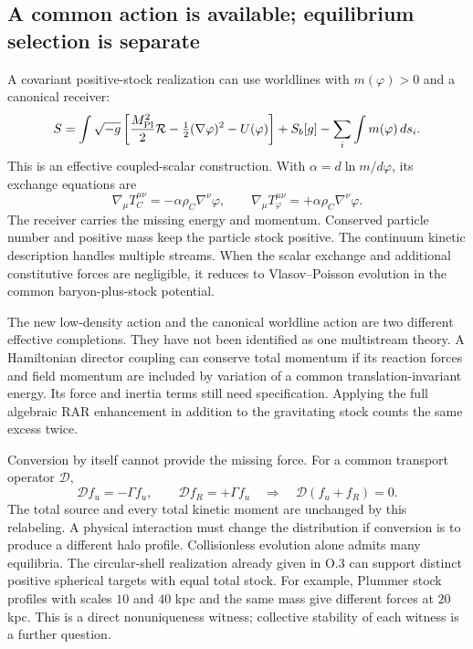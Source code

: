 \documentclass[11pt]{article}
\begin{document}
\subsection{A common action is available; equilibrium selection is separate}
A covariant positive-stock realization can use worldlines with
$m(\varphi)>0$ and a canonical receiver:
\begin{equation}\label{eq:receiver}
 S=\int\sqrt{-g}\left[\frac{M_{\rm Pl}^2}{2}\mathcal R
 -\tfrac12(\nabla\varphi)^2-U(\varphi)\right]+S_b[g]
 -\sum_i\int m(\varphi)\,ds_i.
\end{equation}
This is an effective coupled-scalar construction\cite{Amendola}. With
$\alpha=d\ln m/d\varphi$, its exchange equations are
\begin{equation}
 \nabla_\mu T_C^{\mu\nu}=-\alpha\rho_C\nabla^\nu\varphi,
 \qquad
 \nabla_\mu T_\varphi^{\mu\nu}=+\alpha\rho_C\nabla^\nu\varphi.
\end{equation}
The receiver carries the missing energy and momentum. Conserved particle
number and positive mass keep the particle stock positive. The continuum
kinetic description handles multiple streams. When the scalar exchange and
additional constitutive forces are negligible, it reduces to Vlasov--Poisson
evolution in the common baryon-plus-stock potential.

The new low-density action and the canonical worldline action are two
different effective completions. They have not been identified as one
multistream theory. A Hamiltonian director coupling can conserve total
momentum if its reaction forces and field momentum are included by variation
of a common translation-invariant energy. Its force and inertia terms still
need specification. Applying the full algebraic RAR enhancement in addition
to the gravitating stock counts the same excess twice.

Conversion by itself cannot provide the missing force. For a common
transport operator $\mathcal D$,
\begin{equation}
 \mathcal D f_u=-\Gamma f_u,\qquad
 \mathcal D f_R=+\Gamma f_u
 \quad\Longrightarrow\quad
 \mathcal D(f_u+f_R)=0.
\end{equation}
The total source and every total kinetic moment are unchanged by this
relabeling. A physical interaction must change the distribution if conversion
is to produce a different halo profile. Collisionless evolution alone admits
many equilibria. The circular-shell realization already given in O.3 can
support distinct positive spherical targets with equal total stock. For
example, Plummer stock profiles with scales $10$ and $40$ kpc and the same
mass give different forces at $20$ kpc. This is a direct nonuniqueness witness;
collective stability of each witness is a further question.
\end{document}
